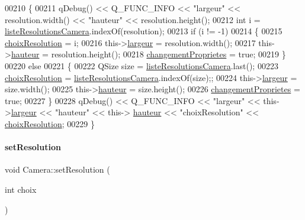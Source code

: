 \begin{DoxyCode}
00210 \{
00211     qDebug() << Q\_FUNC\_INFO << \textcolor{stringliteral}{"largeur"} << resolution.width() << \textcolor{stringliteral}{"hauteur"} << resolution.height();
00212     \textcolor{keywordtype}{int} i = \hyperlink{class_camera_a96af62eaf7828664865b56e7c69e771c}{listeResolutionsCamera}.indexOf(resolution);
00213     \textcolor{keywordflow}{if} (i != -1)
00214     \{
00215         \hyperlink{class_camera_a3fdddf6f548f04d7bdc26f32602a03d4}{choixResolution} = i;
00216         this->\hyperlink{class_camera_ad64f26cdfc5aa561208b273d430938cf}{largeur} = resolution.width();
00217         this->\hyperlink{class_camera_a5d89d7f9d1a5eab4175dd168c7fbf1c7}{hauteur} = resolution.height();
00218         \hyperlink{class_camera_a50d2b3ef5c08f8b61bbe2115d71005bd}{changementProprietes} = \textcolor{keyword}{true};
00219     \}
00220     \textcolor{keywordflow}{else}
00221     \{
00222         QSize size = \hyperlink{class_camera_a96af62eaf7828664865b56e7c69e771c}{listeResolutionsCamera}.last();
00223         \hyperlink{class_camera_a3fdddf6f548f04d7bdc26f32602a03d4}{choixResolution} = \hyperlink{class_camera_a96af62eaf7828664865b56e7c69e771c}{listeResolutionsCamera}.indexOf(size);;
00224         this->\hyperlink{class_camera_ad64f26cdfc5aa561208b273d430938cf}{largeur} = size.width();
00225         this->\hyperlink{class_camera_a5d89d7f9d1a5eab4175dd168c7fbf1c7}{hauteur} = size.height();
00226         \hyperlink{class_camera_a50d2b3ef5c08f8b61bbe2115d71005bd}{changementProprietes} = \textcolor{keyword}{true};
00227     \}
00228     qDebug() << Q\_FUNC\_INFO << \textcolor{stringliteral}{"largeur"} << this->\hyperlink{class_camera_ad64f26cdfc5aa561208b273d430938cf}{largeur} << \textcolor{stringliteral}{"hauteur"} << this->
      \hyperlink{class_camera_a5d89d7f9d1a5eab4175dd168c7fbf1c7}{hauteur} << \textcolor{stringliteral}{"choixResolution"} << \hyperlink{class_camera_a3fdddf6f548f04d7bdc26f32602a03d4}{choixResolution};
00229 \}
\end{DoxyCode}
\mbox{\label{class_camera_a7ff6343220c3ccd64ff513d2af37e1f3}} 
\paragraph{\texorpdfstring{set\+Resolution}{setResolution}\hspace{0.1cm}{\footnotesize\ttfamily [3/3]}}
{\footnotesize\ttfamily void Camera\+::set\+Resolution (\begin{DoxyParamCaption}\item[{int}]{choix }\end{DoxyParamCaption})\hspace{0.3cm}{\ttfamily [slot]}}



